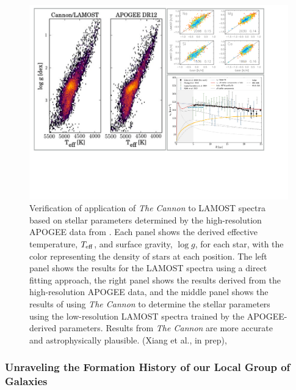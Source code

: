\documentclass[oneside,11pt]{amsart}
\begin{document}
\begin{figure}[h!]
%
\vskip -0.1in
%
\includegraphics[width=\textwidth]{figs/LGplots} %
%
\caption{\small Verification of application of {\it The Cannon} to
LAMOST spectra based on stellar parameters determined by the
high-resolution APOGEE data from \citet{2017ApJ...836....5H}.  Each panel shows
the derived effective temperature, $T_{\rm eff}$, and surface gravity,
$\log g$, for each star, with the color representing the density of
stars at each position.  The left panel shows the results for the LAMOST
spectra using a direct fitting approach, the right panel shows the
results derived from the high-resolution APOGEE data, and the middle
panel shows the results of using {\it The Cannon} to determine the
stellar parameters using the low-resolution LAMOST spectra trained by
the APOGEE-derived parameters.  Results from {\it The Cannon} are more
accurate and astrophysically plausible.  (Xiang et al., in prep), \citep{2019ApJ...871..120E} }
%
\label{fig:Cannon}
%
\end{figure}

\subsubsection{Unraveling the Formation History of our Local Group of Galaxies}
\label{sec:localgroup}
~\medskip
\end{document}
